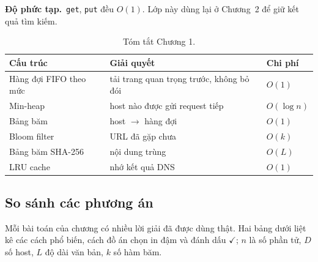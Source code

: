 \documentclass[9pt,twocolumn,a4paper]{extarticle}
\newcommand{\code}[1]{\texttt{#1}}
\newcommand{\dpt}{\textcolor{linkblue}{\textbf{Độ phức tạp.}}~}
\begin{document}
\dpt \code{get}, \code{put} đều $O(1)$. Lớp này dùng lại ở Chương~2 để giữ kết quả tìm kiếm.

\begin{table}[H]
\centering
\caption{Tóm tắt Chương 1.}
\label{tab:c1}
\footnotesize
\begin{tabular}{@{}p{2.0cm}p{3.3cm}l@{}}
\toprule
Cấu trúc & Giải quyết & Chi phí \\
\midrule
Hàng đợi FIFO theo mức & tải trang quan trọng trước, không bỏ đói & $O(1)$ \\
Min-heap & host nào được gửi request tiếp & $O(\log n)$ \\
Bảng băm & host $\to$ hàng đợi & $O(1)$ \\
Bloom filter & URL đã gặp chưa & $O(k)$ \\
Bảng băm SHA-256 & nội dung trùng & $O(L)$ \\
LRU cache & nhớ kết quả DNS & $O(1)$ \\
\bottomrule
\end{tabular}
\end{table}
\subsection*{So sánh các phương án}
Mỗi bài toán của chương có nhiều lời giải đã được dùng thật. Hai bảng dưới liệt kê các cách phổ biến, cách đồ án chọn in đậm và đánh dấu $\checkmark$; $n$ là số phần tử, $D$ số host, $L$ độ dài văn bản, $k$ số hàm băm.
\end{document}
